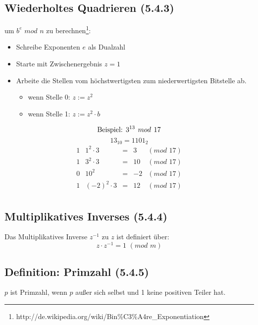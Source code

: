 \subsection{Wiederholtes Quadrieren (5.4.3)}
um $b^e \hspace{4pt} mod \hspace{4pt} n$ zu berechnen\footnote{http://de.wikipedia.org/wiki/Bin\%C3\%A4re\_Exponentiation}:
\begin{itemize}
  \item Schreibe Exponenten $e$ als Dualzahl
  \item Starte mit Zwischenergebnis $z = 1$
  \item Arbeite die Stellen vom höchstwertigsten zum niederwertigsten Bitstelle ab.
  	\begin{itemize}
  		\item wenn Stelle 0: $z := z^2$
  		\item wenn Stelle 1: $z := z^2 \cdot b$
		\end{itemize}
\end{itemize}

$$\textnormal{Beispiel: } 3^{13} \hspace{4pt} mod \hspace{4pt} 17$$
$$13_{10} = 1101_2$$
$$
\begin{array}{crclc}
	1 & 1^2 \cdot 3 & = & 3 &  (mod \hspace{4pt} 17) \\
	1 & 3^2 \cdot 3 & = & 10 &  (mod \hspace{4pt} 17) \\
	0 & 10^2 & = & -2 &  (mod \hspace{4pt} 17) \\
	1 & (-2)^2 \cdot 3 & = & 12 &  (mod \hspace{4pt} 17) \\
\end{array}
$$

\subsection{Multiplikatives Inverses (5.4.4)}
Das Multiplikatives Inverse $z^{-1}$ zu $z$ ist definiert über:
$$z \cdot z^{-1} = 1 \hspace{4pt} (mod \hspace{4pt} m) $$

\subsection{Definition: Primzahl (5.4.5)}
$p$ ist Primzahl, wenn $p$ außer sich selbst und 1 keine positiven Teiler hat.

